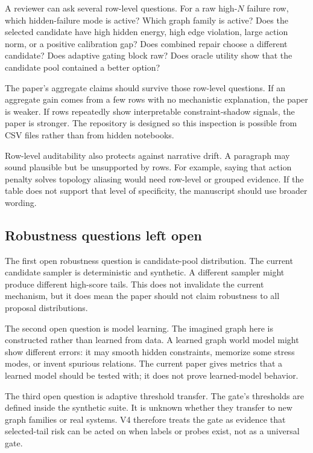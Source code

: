 \documentclass{article}
\begin{document}
A reviewer can ask several row-level questions.  For a raw high-\(N\) failure
row, which hidden-failure mode is active?  Which graph family is active?  Does
the selected candidate have high hidden energy, high edge violation, large
action norm, or a positive calibration gap?  Does combined repair choose a
different candidate?  Does adaptive gating block raw?  Does oracle utility show
that the candidate pool contained a better option?

The paper's aggregate claims should survive those row-level questions.  If an
aggregate gain comes from a few rows with no mechanistic explanation, the paper
is weaker.  If rows repeatedly show interpretable constraint-shadow signals,
the paper is stronger.  The repository is designed so this inspection is
possible from CSV files rather than from hidden notebooks.

Row-level auditability also protects against narrative drift.  A paragraph may
sound plausible but be unsupported by rows.  For example, saying that action
penalty solves topology aliasing would need row-level or grouped evidence.  If
the table does not support that level of specificity, the manuscript should use
broader wording.

\subsection{Robustness questions left open}

The first open robustness question is candidate-pool distribution.  The current
candidate sampler is deterministic and synthetic.  A different sampler might
produce different high-score tails.  This does not invalidate the current
mechanism, but it does mean the paper should not claim robustness to all
proposal distributions.

The second open question is model learning.  The imagined graph here is
constructed rather than learned from data.  A learned graph world model might
show different errors: it may smooth hidden constraints, memorize some stress
modes, or invent spurious relations.  The current paper gives metrics that a
learned model should be tested with; it does not prove learned-model behavior.

The third open question is adaptive threshold transfer.  The gate's thresholds
are defined inside the synthetic suite.  It is unknown whether they transfer to
new graph families or real systems.  V4 therefore treats the gate as evidence
that selected-tail risk can be acted on when labels or probes exist, not as a
universal gate.
\end{document}
